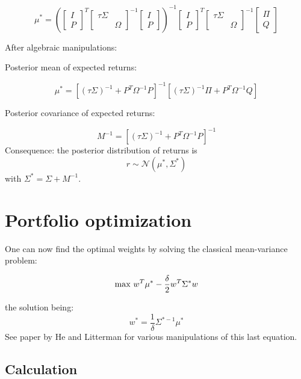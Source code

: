 \documentclass[
]{article}
\begin{document}
\[
\mu^* = \left( 
\begin{bmatrix}
I \\ 
P
\end{bmatrix}
^T 
\begin{bmatrix}
\tau \Sigma & \\
& \Omega
\end{bmatrix}
^{-1} 
\begin{bmatrix}
I \\ 
P
\end{bmatrix}
\right)^{-1}
\begin{bmatrix}
I \\ 
P
\end{bmatrix}
^T
\begin{bmatrix}
\tau \Sigma & \\
& \Omega
\end{bmatrix}
^{-1} \begin{bmatrix}
\Pi \\ 
Q
\end{bmatrix}
\]

After algebraic manipulations:

Posterior mean of expected returns:

\[
\mu^* = \left[ (\tau \Sigma)^{-1} + P^T\Omega^{-1} P \right]^{-1} \left[ (\tau \Sigma)^{-1} \Pi + P^T\Omega^{-1} Q \right]
\]

Posterior covariance of expected returns:

\[
M^{-1} = \left[ (\tau \Sigma)^{-1} + P^T\Omega^{-1} P \right]^{-1}
\] Consequence: the posterior distribution of returns is \[
r \sim \mathcal{N}(\mu^*, \Sigma^*)
\] with \(\Sigma^* = \Sigma + M^{-1}\).

\hypertarget{portfolio-optimization}{%
\section{Portfolio optimization}\label{portfolio-optimization}}

One can now find the optimal weights by solving the classical
mean-variance problem:

\[
    \mbox{max} \   w^T\mu^*  - \frac{\delta}{2} w^T \Sigma^* w  \\
\]

the solution being: \[
w^* = \frac{1}{\delta} \Sigma^{*-1} \mu^*
\] See paper by He and Litterman for various manipulations of this last
equation.

\hypertarget{calculation}{%
\subsection{Calculation}\label{calculation}}
\end{document}
